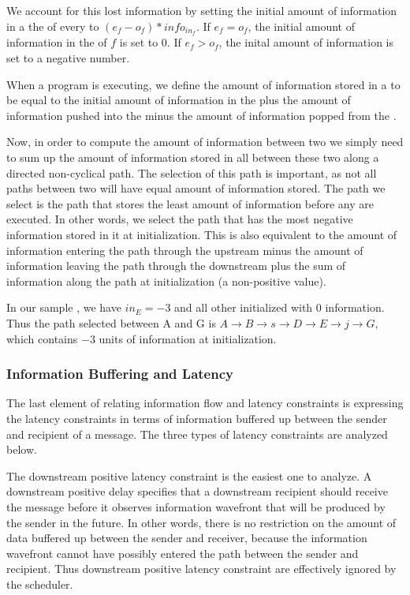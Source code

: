 We account for this lost information by setting the initial amount
of information in a the {\Input} {{\Channel}} of every {\filter} to $(e_f
- o_f) * info_{in_f}$.  If $e_f = o_f$, the initial amount of
information in the {\Input} {{\Channel}} of $f$ is set to 0. If $e_f >
o_f$, the inital amount of information is set to a negative
number.

When a {\StreamIt} program is executing, we define the amount of
information stored in a {{\Channel}} to be equal to the initial amount
of information in the {{\Channel}} plus the amount of information
pushed into the {{\Channel}} minus the amount of information popped
from the {{\Channel}}.

Now, in order to compute the amount of information between two
{\filters} we simply need to sum up the amount of information stored
in all {{\Channels}} between these two {\filters} along a directed
non-cyclical path.  The selection of this path is important, as
not all paths between two {\filters} will have equal amount of
information stored.  The path we select is the path that stores
the least amount of information before any {\filters} are executed.
In other words, we select the path that has the most negative
information stored in it at initialization.  This is also
equivalent to the amount of information entering the path through
the upstream {\filter} minus the amount of information leaving the
path through the downstream {\filter} plus the sum of information
along the path at initialization (a non-positive value).

In our sample {\pipeline}, we have $in_E = -3$ and all other
{{\Channels}} initialized with 0 information. Thus the path selected
between {\filters} A and G is $A \to B \to s \to D \to E \to j \to
G$, which contains $-3$ units of information at initialization.

\subsubsection{Information Buffering and Latency}

The last element of relating information flow and latency
constraints is expressing the latency constraints in terms of
information buffered up between the sender and recipient of a
message. The three types of latency constraints are analyzed
below.


The downstream positive latency constraint is the easiest one to
analyze. A downstream positive delay specifies that a downstream
recipient should receive the message before it observes
information wavefront that will be produced by the sender in the
future.  In other words, there is no restriction on the amount of
data buffered up between the sender and receiver, because the
information wavefront cannot have possibly entered the path
between the sender and recipient. Thus downstream positive latency
constraint are effectively ignored by the scheduler.

